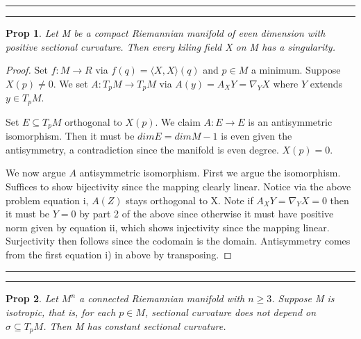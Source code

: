 \documentclass[11pt]{article}
\newcommand{\question}[2] {\vspace{.25in} \hrule\vspace{0.5em}
\noindent{\bf #1: #2} \vspace{0.5em}
\hrule \vspace{.10in}}
\newtheorem{prop}{Prop}
\begin{document}
\question{Question 4}

\textbf{More on Killing Fields}

\begin{prop}
	Let M be a compact Riemannian manifold of even dimension with positive sectional curvature. Then every kiling field X on M has a singularity. 
\end{prop}

\begin{proof}
	Set $f :M \to R$ via $f(q) = \langle X,X\rangle(q)$ and $p \in M$ a minimum. Suppose $X(p) \neq 0$. We set $A : T_p M \to T_p M $ via $A(y) = A_X Y = \nabla_Y X$ where $Y$ extends $y \in T_p M$. 

	Set $E \subseteq T_p M$ orthogonal to $X(p)$. We claim $A : E \to E$ is an antisymmetric isomorphism. Then it must be $dim E = dim M - 1$ is even given the antisymmetry, a contradiction since the manifold is even degree. $X(p) = 0$. 

	We now argue $A$ antisymmetric isomorphism. First we argue the isomorphism. Suffices to show bijectivity since the mapping clearly linear. Notice via the above problem equation i, $A(Z)$ stays orthogonal to X. Note if $A_X Y = \nabla_Y X = 0$ then it must be $Y = 0$ by part 2 of the above since otherwise it must have positive norm given by equation ii, which shows injectivity since the mapping linear. Surjectivity then follows since the codomain is the domain. Antisymmetry comes from the first equation i) in above by transposing.
\end{proof}

\question{Question 5}

\textbf{Schur's Theorem}

\begin{prop}
	Let $M^n$ a connected Riemannian manifold with $n \geq 3$. Suppose M is isotropic, that is, for each $p \in M$, sectional curvature does not depend on $\sigma \subseteq T_p M$. Then M has constant sectional curvature.
\end{prop}
\end{document}
